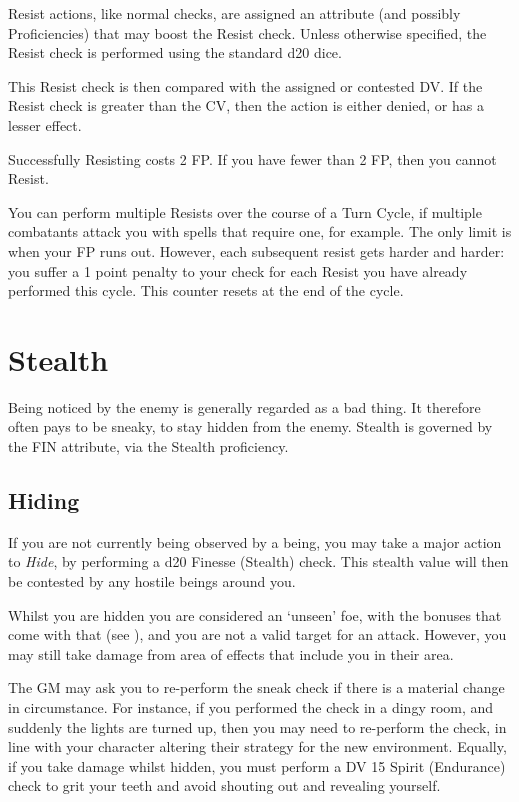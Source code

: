 Resist actions, like normal checks, are assigned an attribute (and possibly Proficiencies) that may boost the Resist check. Unless otherwise specified, the Resist check is performed using the standard d20 dice. 

This Resist check is then compared with the assigned or contested DV. If the Resist check is greater than the CV, then the action is either denied, or has a lesser effect. 

Successfully Resisting costs 2 FP. If you have fewer than 2 FP, then you cannot Resist.

You can perform multiple Resists over the course of a Turn Cycle, if multiple combatants attack you with spells that require one, for example. The only limit is when your FP runs out. However, each subsequent resist gets harder and harder: you suffer a 1 point penalty to your check for each Resist you have already performed this cycle. This counter resets at the end of the cycle.

\section{Stealth} \label{S:Stealth}

Being noticed by the enemy is generally regarded as a bad thing. It therefore often pays to be sneaky, to stay hidden from the enemy. Stealth is governed by the FIN attribute, via the Stealth proficiency. 

\subsection{Hiding}

If you are not currently being observed by a being, you may take a major action to {\it Hide}, by performing a d20 Finesse (Stealth) check. This stealth value will then be contested by any hostile beings around you. 

Whilst you are hidden you are considered an `unseen' foe, with the bonuses that come with that (see \pageref{S:Unseen}), and you are not a valid target for an attack. However, you may still take damage from area of effects that include you in their area. 

The GM may ask you to re-perform the sneak check if there is a material change in circumstance. For instance, if you performed the check in a dingy room, and suddenly the lights are turned up, then you may need to re-perform the check, in line with your character altering their strategy for the new environment. Equally, if you take damage whilst hidden, you must perform a DV 15 Spirit (Endurance) check to grit your teeth and avoid shouting out and revealing yourself. 

